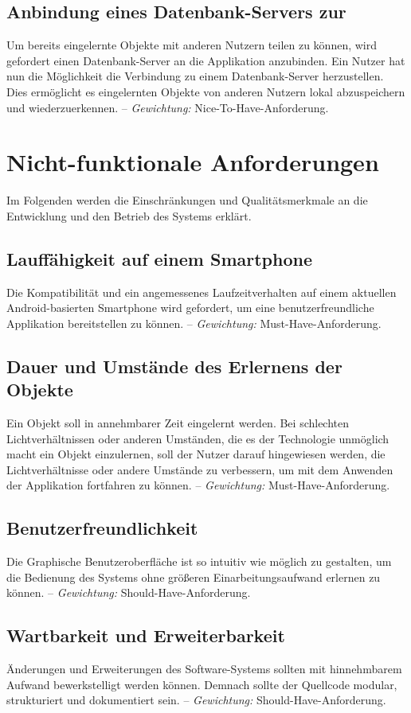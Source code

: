\documentclass[oneside]{ausarbeitung}
\begin{document}
\subsection{Anbindung eines Datenbank-Servers zur}
Um bereits eingelernte Objekte mit anderen Nutzern teilen zu können, wird gefordert einen Datenbank-Server an die Applikation anzubinden. Ein Nutzer hat nun die Möglichkeit die Verbindung zu einem Datenbank-Server herzustellen. Dies ermöglicht es eingelernten Objekte von anderen Nutzern lokal abzuspeichern und wiederzuerkennen. -- \textit{Gewichtung:} Nice-To-Have-Anforderung.
%
\section{Nicht-funktionale Anforderungen}
Im Folgenden werden die Einschränkungen und Qualitätsmerkmale an die Entwicklung und den Betrieb des Systems erklärt.

\subsection{Lauffähigkeit auf einem Smartphone}
Die Kompatibilität und ein angemessenes Laufzeitverhalten auf einem aktuellen Android-basierten Smartphone wird gefordert, um eine benutzerfreundliche Applikation bereitstellen zu können. -- \textit{Gewichtung:} Must-Have-Anforderung.

\subsection{Dauer und Umstände des Erlernens der Objekte}
Ein Objekt soll in annehmbarer Zeit eingelernt werden. Bei schlechten Lichtverhältnissen oder anderen Umständen, die es der Technologie unmöglich macht ein Objekt einzulernen, soll der Nutzer darauf hingewiesen werden, die Lichtverhältnisse oder andere Umstände zu verbessern, um mit dem Anwenden der Applikation fortfahren zu können. -- \textit{Gewichtung:} Must-Have-Anforderung.

\subsection{Benutzerfreundlichkeit}
Die Graphische Benutzeroberfläche ist so intuitiv wie möglich zu gestalten, um die Bedienung des Systems ohne größeren Einarbeitungsaufwand erlernen zu können. -- \textit{Gewichtung:} Should-Have-Anforderung.

\subsection{Wartbarkeit und Erweiterbarkeit}
Änderungen und Erweiterungen des Software-Systems sollten mit hinnehmbarem Aufwand bewerkstelligt werden können. Demnach sollte der Quellcode modular, strukturiert und dokumentiert sein. -- \textit{Gewichtung:} Should-Have-Anforderung.
\end{document}
